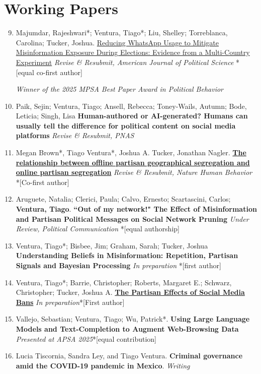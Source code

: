 \documentclass[letterpaper, 11pt]{article}
\newenvironment{benumerate}[1]{
    \let\oldItem\item
    \def\item{\addtocounter{enumi}{-2}\oldItem}
    \begin{enumerate}[leftmargin=2em]
    \setcounter{enumi}{#1}
    \addtocounter{enumi}{1}
}{
    \end{enumerate}
}
\begin{document}
\section*{Working Papers}

    \begin{benumerate}{8}

       \item Majumdar, Rajeshwari*; Ventura, Tiago*; Liu, Shelley; Torreblanca, Carolina; Tucker, Joshua. \href{https://osf.io/preprints/socarxiv/zrsqw_v1}{Reducing WhatsApp Usage to Mitigate Misinformation Exposure During Elections: Evidence from a Multi-Country Experiment} \textit{Revise \& Resubmit, American Journal of Political Science} *[equal co-first author]

       \subitem \textit{Winner of the 2025 MPSA Best Paper Award in Political Behavior}


        \item Paik, Sejin; Ventura, Tiago; Ansell, Rebecca; Toney-Wails, Autumn; Bode, Leticia;  Singh, Lisa \textbf{Human-authored or AI-generated? Humans can usually tell the difference for political content on social media platforms} \textit{Revise \& Resubmit, PNAS}

        \item  Megan Brown*, Tiago Ventura*, Joshua A. Tucker, Jonathan Nagler. \href{https://arxiv.org/abs/2512.07121}{\textbf{The relationship between offline partisan geographical segregation and online partisan segregation}}  \textit{Revise \& Resubmit, Nature Human Behavior} *[Co-first author]

        \item Aruguete, Natalia; Clerici, Paula; Calvo, Ernesto; Scartascini, Carlos; \textbf{Ventura, Tiago}. \textbf{``Out of my network!" The Effect of Misinformation and Partisan Political Messages on Social Network Pruning} \textit{Under Review, Political Communication} *[equal authorship]

        \item Ventura, Tiago*; Bisbee, Jim; Graham, Sarah; Tucker, Joshua \textbf{Understanding Beliefs in Misinformation: Repetition, Partisan Signals and Bayesian Processing} \textit{In preparation} *[first author]

        \item Ventura, Tiago*; Barrie, Christopher; Roberts, Margaret E.; Schwarz, Christopher; Tucker, Joshua A. \href{https://osf.io/preprints/socarxiv/4stfw_v1}{\textbf{The Partisan Effects of Social Media Bans}} \textit{In preparation}*[First author]

         \item Vallejo, Sebastian; Ventura, Tiago; Wu, Patrick*. \textbf{Using Large Language Models and Text-Completion to Augment Web-Browsing Data} \textit{Presented at APSA 2025}*[equal contribution]

         \item Lucia Tiscornia, Sandra Ley, and Tiago Ventura. \textbf{Criminal governance amid the COVID-19 pandemic in Mexico}. \textit{Writing}



     \end{benumerate}
\end{document}

